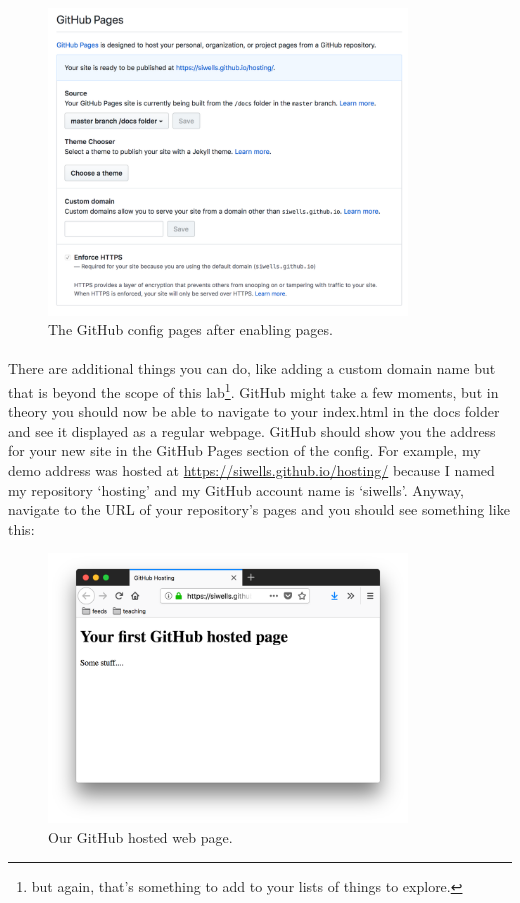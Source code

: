 \documentclass[10pt, a4paper, twosize]{article}
\begin{document}
\begin{figure}[H]
\centering
\includegraphics[width=0.85\textwidth]{images/github_config_after}
\caption{The GitHub config pages after enabling pages.}
\label{fig:github_config_after}
\end{figure}


\paragraph{} There are additional things you can do, like adding a custom domain name but that is beyond the scope of this lab\footnote{but again, that's something to add to your lists of things to explore.}. GitHub might take a few moments, but in theory you should now be able to navigate to your index.html in the docs folder and see it displayed as a regular webpage. GitHub should show you the address for your new site in the GitHub Pages section of the config. For example, my demo address was hosted at \url{https://siwells.github.io/hosting/} because I named my repository `hosting' and my GitHub account name is `siwells'. Anyway, navigate to the URL of your repository's pages and you should see something like this:

\begin{figure}[H]
\centering
\includegraphics[width=0.85\textwidth]{images/github_hello}
\caption{Our GitHub hosted web page.}
\label{fig:github_hello}
\end{figure}
\end{document}

